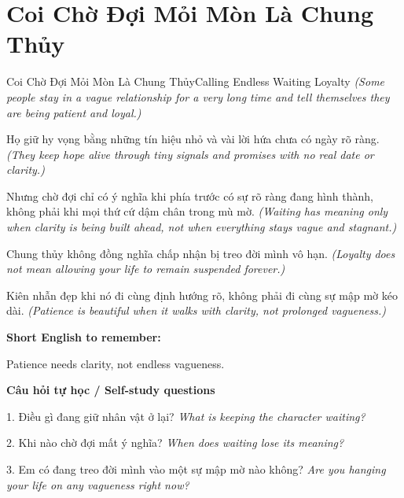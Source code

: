 \section{Coi Chờ Đợi Mỏi Mòn Là Chung Thủy}
\begin{truyen}{Coi Chờ Đợi Mỏi Mòn Là Chung Thủy}{Calling Endless Waiting Loyalty}
\textit{(Some people stay in a vague relationship for a very long time and tell themselves they are being patient and loyal.)}

Họ giữ hy vọng bằng những tín hiệu nhỏ và vài lời hứa chưa có ngày rõ ràng.
\textit{(They keep hope alive through tiny signals and promises with no real date or clarity.)}

Nhưng chờ đợi chỉ có ý nghĩa khi phía trước có sự rõ ràng đang hình thành, không phải khi mọi thứ cứ dậm chân trong mù mờ.
\textit{(Waiting has meaning only when clarity is being built ahead, not when everything stays vague and stagnant.)}

Chung thủy không đồng nghĩa chấp nhận bị treo đời mình vô hạn.
\textit{(Loyalty does not mean allowing your life to remain suspended forever.)}

\end{truyen}

\begin{baihoc}
Kiên nhẫn đẹp khi nó đi cùng định hướng rõ, không phải đi cùng sự mập mờ kéo dài.
\textit{(Patience is beautiful when it walks with clarity, not prolonged vagueness.)}
\end{baihoc}

\begin{ghinhoanh}
\textbf{Short English to remember:}

Patience needs clarity, not endless vagueness.

\end{ghinhoanh}

\begin{tuhocnhanh}
\textbf{Câu hỏi tự học / Self-study questions}

1. Điều gì đang giữ nhân vật ở lại? \textit{What is keeping the character waiting?}

2. Khi nào chờ đợi mất ý nghĩa? \textit{When does waiting lose its meaning?}

3. Em có đang treo đời mình vào một sự mập mờ nào không? \textit{Are you hanging your life on any vagueness right now?}
\end{tuhocnhanh}
\ngancach

